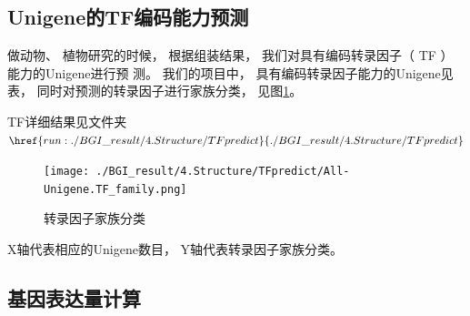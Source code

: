 \documentclass[10pt, oneside,a4paper]{article}
\begin{document}
\subsection{Unigene的TF编码能力预测}
做动物、 植物研究的时候， 根据组装结果， 我们对具有编码转录因子（ TF ）能力的Unigene进行预
测。 我们的项目中， 具有编码转录因子能力的Unigene见表， 同时对预测的转录因子进行家族分类，
见图\ref{tf}。\par
TF详细结果见文件夹$\href{run:./BGI\_result/4.Structure/TFpredict}{./BGI\_result/4.Structure/TFpredict}$\par
\begin{figure}[H]
\centering
\texttt{[image: ./BGI\_result/4.Structure/TFpredict/All-Unigene.TF\_family.png]}
\par
\renewcommand{\figurename}{图}
\caption{转录因子家族分类}
\label{tf}
\end{figure}
\begin{center}
X轴代表相应的Unigene数目， Y轴代表转录因子家族分类。
\end{center}

\subsection{基因表达量计算}
\end{document}
